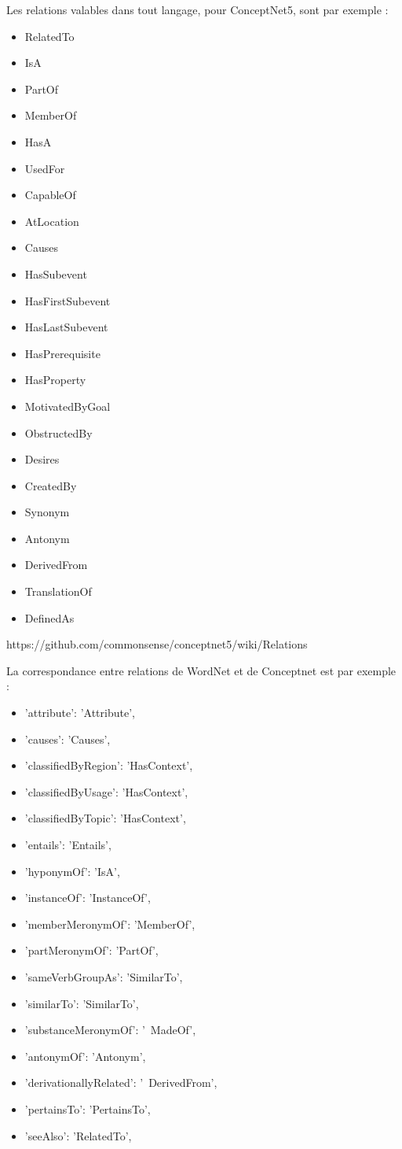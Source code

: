 \documentclass{article}           %
\begin{document}
Les relations valables dans tout langage, pour ConceptNet5, sont par exemple : 
\begin{itemize}
 \item RelatedTo
 \item IsA
 \item PartOf
 \item MemberOf
 \item HasA
 \item UsedFor
 \item CapableOf
 \item AtLocation
 \item Causes
 \item HasSubevent
 \item HasFirstSubevent
 \item HasLastSubevent
 \item HasPrerequisite
 \item HasProperty
 \item MotivatedByGoal
 \item ObstructedBy
 \item Desires
 \item CreatedBy
 \item Synonym
 \item Antonym
 \item DerivedFrom
 \item TranslationOf
 \item DefinedAs
\end{itemize}

https://github.com/commonsense/conceptnet5/wiki/Relations

La correspondance entre relations de WordNet et de Conceptnet est par exemple :
\begin{itemize}
 \item 'attribute': 'Attribute',
 \item 'causes': 'Causes',
 \item 'classifiedByRegion': 'HasContext',
 \item 'classifiedByUsage': 'HasContext',
 \item 'classifiedByTopic': 'HasContext',
 \item 'entails': 'Entails',
 \item 'hyponymOf': 'IsA',
 \item 'instanceOf': 'InstanceOf',
  \item  'memberMeronymOf': 'MemberOf',
  \item  'partMeronymOf': 'PartOf',
  \item  'sameVerbGroupAs': 'SimilarTo',
  \item  'similarTo': 'SimilarTo',
  \item  'substanceMeronymOf': '~MadeOf',
  \item  'antonymOf': 'Antonym',
  \item  'derivationallyRelated': '~DerivedFrom',
  \item  'pertainsTo': 'PertainsTo',
  \item  'seeAlso': 'RelatedTo',
\end{itemize}
\end{document}
